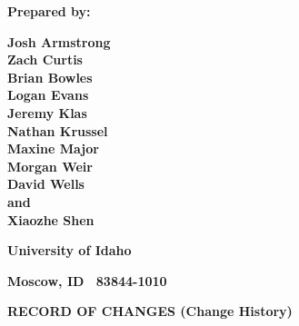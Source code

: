 \documentclass[twoside,letterpaper]{article}
\begin{document}
{\centering{}\bfseries\color{black}
Prepared by:
\par}

{\centering{}\bfseries\color{black}
Josh Armstrong
\\Zach Curtis
\\Brian Bowles
\\Logan Evans
\\Jeremy Klas
\\Nathan Krussel
\\Maxine Major
\\Morgan Weir
\\David Wells
\\and
\\Xiaozhe Shen
\par}

{\centering{}\bfseries\color{black}
University of Idaho
\par}

{\centering{}\bfseries\color{black}
Moscow, ID \ 83844-1010
\par}











{\centering{}\bfseries\color{black}
RECORD OF CHANGES (Change History)
\par}
\end{document}
